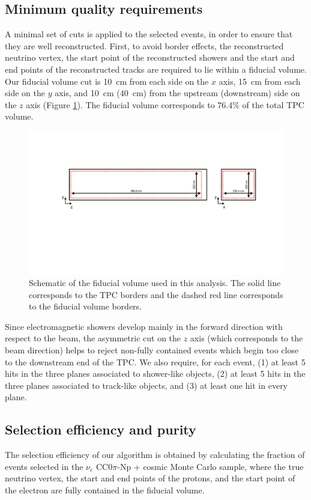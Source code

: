 \subsection{Minimum quality requirements}\label{sec:precuts}
A minimal set of cuts is applied to the selected events, in order to ensure that they are well reconstructed.
First, to avoid border effects, the reconstructed neutrino vertex, the start point of the reconstructed showers and the start and end points of the reconstructed tracks are required to lie within a fiducial volume. Our fiducial volume cut is 10~cm from each side on the $x$ axis, 15~cm from each side on the $y$ axis, and 10~cm (40~cm) from the upstream (downstream) side on the $z$ axis (Figure \ref{fig:fidvol}). The fiducial volume corresponds to 76.4\% of the total TPC volume. 

\begin{figure}
\centering
  \includegraphics[width=0.95\linewidth]{figures/fidvol.pdf}
  \caption{Schematic of the fiducial volume used in this analysis. The solid line corresponds to the TPC borders and the dashed red line corresponds to the fiducial volume borders.}
  \label{fig:fidvol}
\end{figure}

Since electromagnetic showers develop mainly in the forward direction with respect to the beam, the asymmetric cut on the $z$ axis (which corresponds to the beam direction) helps to reject non-fully contained events which begin too close to the downstream end of the TPC.
We also require, for each event, (1) at least 5 hits in the three planes associated to shower-like objects, (2) at least 5 hits in the three planes associated to track-like objects, and (3) at least one hit in every plane.


\subsection{Selection efficiency and purity}\label{sec:eff}
The selection efficiency of our algorithm is obtained by calculating the fraction of events selected in the $\nu_{e}$ CC$0\pi$-Np + cosmic Monte Carlo sample, where the true neutrino vertex, the start and end points of the protons, and the start point of the electron are fully contained in the fiducial volume.

